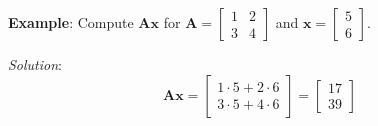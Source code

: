 \begin{exampleBox}
  \textbf{Example}: Compute $ \mathbf{A}\mathbf{x} $ for $ \mathbf{A} = \begin{bmatrix}1 & 2\\3 & 4\end{bmatrix} $ and $ \mathbf{x} = \begin{bmatrix}5 \\ 6\end{bmatrix} $.

  \emph{Solution}:
  \begin{equation*}
    \mathbf{A}\mathbf{x} = \begin{bmatrix}1 \cdot 5 + 2 \cdot 6 \\ 3 \cdot 5 + 4 \cdot 6\end{bmatrix} = \begin{bmatrix}17 \\ 39\end{bmatrix}
  \end{equation*}
\end{exampleBox}



